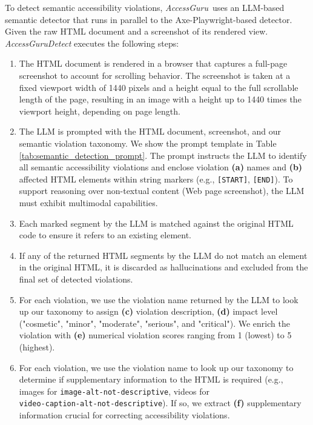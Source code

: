 \documentclass[sigconf, nonacm]{acmart}
\newcommand{\method}{\emph{AccessGuru}}
\begin{document}
To detect semantic accessibility violations, \method\ uses an LLM-based semantic detector that runs in parallel to the Axe-Playwright-based detector. Given the raw HTML document and a screenshot of its rendered view.  \method \emph{Detect} executes the following steps:
\begin{enumerate}
\item The HTML document is rendered in a browser that captures a full-page screenshot to account for scrolling behavior. The screenshot is taken at a fixed viewport width of 1440 pixels and a height equal to the full scrollable length of the page, resulting in an image with a height up to 1440 times the viewport height, depending on page length.

\item The LLM is prompted with the HTML document, screenshot, and our semantic violation taxonomy. We show the prompt template in Table \ref{tab:semantic_detection_prompt}. The prompt instructs the LLM to identify all semantic accessibility violations and enclose violation \textbf{(a)} names and \textbf{(b)} affected HTML elements within string markers (e.g., \texttt{[START]}, \texttt{[END]}). To support reasoning over non-textual content (Web page screenshot), the LLM must exhibit multimodal capabilities.
  \item Each marked segment by the LLM is matched against the original HTML code to ensure it refers to an existing element. 
\item If any of the returned HTML segments by the LLM do not match an element in the original HTML, it is discarded as hallucinations and excluded from the final set of detected violations.
  \item For each violation, we use the violation name returned by the LLM to look up our taxonomy to assign \textbf{(c)} violation description, \textbf{(d)} impact level ("cosmetic", "minor", "moderate", "serious", and "critical"). We enrich the violation with \textbf{(e)} numerical violation scores ranging from 1 (lowest) to 5 (highest).

\item  For each violation, we use the violation name to look up our taxonomy to determine if supplementary information to the HTML is required (e.g., images for \texttt{image-alt-not-descriptive}, videos for \\ \texttt{video-caption-alt-not-descriptive}). If so, we extract \textbf{(f)} supplementary information crucial for correcting accessibility violations. 
\end{enumerate}
\end{document}

